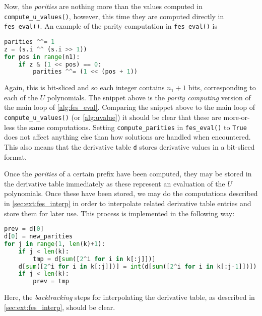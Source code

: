 Now, the \textit{parities} are nothing more than the values computed in \texttt{compute\_u\_values()}, however, this time they are computed directly in \texttt{fes\_eval()}. An example of the parity computation in \texttt{fes\_eval()} is 
\begin{lstlisting}[language=Python,style=mystyle]
parities ^^= 1
z = (s.i ^^ (s.i >> 1))
for pos in range(n1):
    if z & (1 << pos) == 0:
        parities ^^= (1 << (pos + 1))
\end{lstlisting}
Again, this is bit-sliced and so each integer contains $n_1 + 1$ bits, corresponding to each of the $U$ polynomials. The snippet above is the \textit{parity computing} version of the main loop of \cref{alg:fes_eval}. Comparing the snippet above to the main loop of \texttt{compute\_u\_values()} (or \cref{alg:uvalue}) it should be clear that these are more-or-less the same computations. Setting \texttt{compute\_parities} in \texttt{fes\_eval()} to \texttt{True} does not affect anything else than how solutions are handled when encountered. This also means that the derivative table \texttt{d} stores derivative values in a bit-sliced format.

Once the \textit{parities} of a certain prefix have been computed, they may be stored in the derivative table immediately as these represent an evaluation of the $U$ polynomials. Once these have been stored, we may do the computations described in \cref{sec:ext:fes_interp} in order to interpolate related derivative table entries and store them for later use. This process is implemented in the following way:
\begin{lstlisting}[language=Python,style=mystyle]
prev = d[0]
d[0] = new_parities
for j in range(1, len(k)+1):
    if j < len(k):
        tmp = d[sum([2^i for i in k[:j]])]
    d[sum([2^i for i in k[:j]])] = int(d[sum([2^i for i in k[:j-1]])]) ^^ int(prev)
    if j < len(k):
        prev = tmp
\end{lstlisting}
Here, the \textit{backtracking} steps for interpolating the derivative table, as described in \cref{sec:ext:fes_interp}, should be clear.

